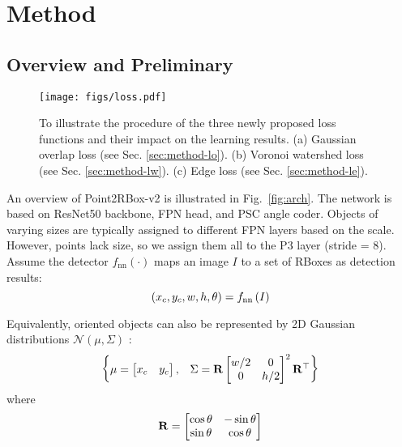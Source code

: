 \section{Method}
\label{sec:method}

\subsection{Overview and Preliminary}
\label{sec:method-arch}

\begin{figure*}[t]
\setlength{\abovecaptionskip}{1.2mm}
\centering
\texttt{[image: figs/loss.pdf]}
\caption{To illustrate the procedure of the three newly proposed loss functions and their impact on the learning results. (a) Gaussian overlap loss (see Sec. \ref{sec:method-lo}). (b) Voronoi watershed loss (see Sec. \ref{sec:method-lw}). (c) Edge loss (see Sec. \ref{sec:method-le}).}
\label{fig:loss}
\vspace{-6pt}
\end{figure*}

An overview of Point2RBox-v2 is illustrated in Fig.~\ref{fig:arch}. The network is based on ResNet50 \cite{he2016deep} backbone, FPN \cite{Lin2017Feature} head, and PSC \cite{yu2024boundary} angle coder. Objects of varying sizes are typically assigned to different FPN layers based on the scale. However, points lack size, so we assign them all to the P3 layer (stride = 8). Assume the detector $f_\text{nn}\left ( \cdot \right ) $ maps an image $I$ to a set of RBoxes as detection results:
\begin{equation} \setlength\abovedisplayskip{6pt} \setlength\belowdisplayskip{6pt}
\left(
 x_c, y_c, w, h, \theta
\right) = f_\text{nn}\left ( I \right )
\end{equation}

Equivalently, oriented objects can also be represented by 2D Gaussian distributions $\mathcal{N}(\mu, \Sigma)$ \cite{yang2023detecting}:
\begin{equation} \setlength\abovedisplayskip{6pt} \setlength\belowdisplayskip{6pt}
\begin{Bmatrix}
\mu=\begin{bmatrix}
x_c & y_c
\end{bmatrix},
&
\Sigma=\mathbf{R}\begin{bmatrix}
 w/2 & 0 \\
 0 & h/2
\end{bmatrix} ^{2} \mathbf{R}^\top 
\end{Bmatrix}
\end{equation}
where 
\begin{equation} \setlength\abovedisplayskip{6pt} \setlength\belowdisplayskip{6pt}
\mathbf{R}=\begin{bmatrix}
 \cos \theta & -\sin \theta \\
 \sin \theta & \cos \theta
\end{bmatrix}
\label{equ:rotation}
\end{equation}

